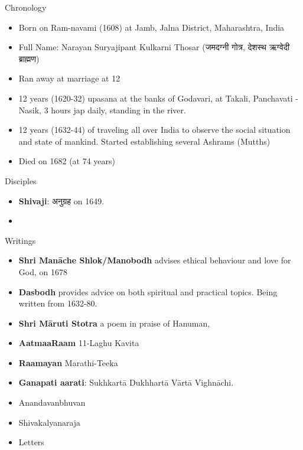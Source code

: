 Chronology
\begin{itemize}
\item Born on Ram-navami (1608) at Jamb, Jalna District, Maharashtra, India
\item Full Name: Narayan Suryajipant Kulkarni Thosar (जमदग्नी गोत्र, देशस्थ ऋग्वेदी ब्राह्मण)
\item Ran away at marriage at 12
\item 12 years (1620-32) upasana at the banks of Godavari, at Takali, Panchavati - Nasik, 3 hours jap daily, standing in the river.
\item 12 years (1632-44) of traveling all over India to observe the social situation and state of mankind. Started establishing several Ashrams (Mutths)
\item Died on 1682 (at 74 years)
\end{itemize}

Disciples
\begin{itemize}
\item \textbf{Shivaji}: अनुग्रह   on 1649.
\item 
\end{itemize}

Writings
\begin{itemize}
\item \textbf{Shri Manāche Shlok/Manobodh} advises ethical behaviour and love for God, on 1678
\item \textbf{Dasbodh} provides advice on both spiritual and practical topics. Being written from 1632-80. 
\item \textbf{Shri Māruti Stotra} a poem in praise of Hanuman, 
\item \textbf{AatmaaRaam} 11-Laghu Kavita
\item \textbf{Raamayan} Marathi-Teeka
\item \textbf{Ganapati aarati}: Sukhkartā Dukhhartā Vārtā Vighnāchi.
\item Anandavanbhuvan
\item Shivakalyanaraja
\item Letters
\end{itemize}

